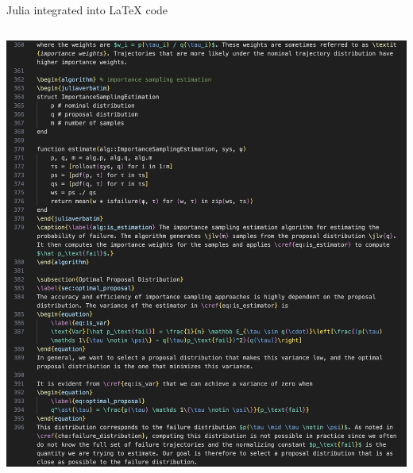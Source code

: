 \begin{frame}[fragile]{Julia integrated into \LaTeX{} code}

\begin{columns}
  \hfill
  \begin{column}{0.33\textwidth}
    \begin{minipage}[t]{\linewidth}
      \centering
      \includegraphics[width=\linewidth]{media/val-pg147-latex.png}


\end{minipage}
\end{column}
\end{columns}
\end{frame}
